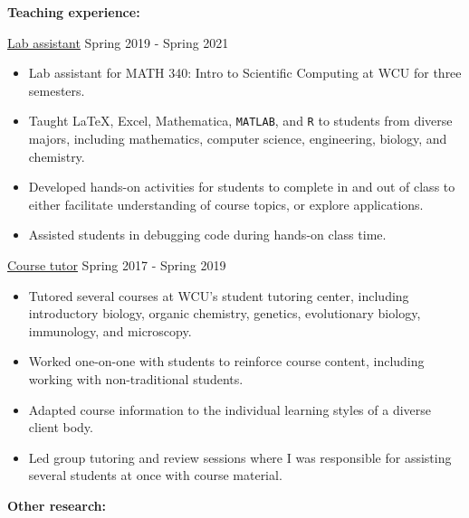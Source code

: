 \documentclass[11pt]{article}
\begin{document}
\vspace{0.2in}
\textbf{Teaching experience:}

\ul{Lab assistant} \hfill Spring 2019 - Spring 2021 
\begin{itemize}
\item Lab assistant for MATH 340: Intro to Scientific Computing at WCU for three semesters.
\item Taught \LaTeX{}, Excel, Mathematica, \texttt{MATLAB}, and \texttt{R} to students from diverse majors, including mathematics, computer science, engineering, biology, and chemistry.
\item Developed hands-on activities for students to complete in and out of class to either facilitate understanding of course topics, or explore applications.
\item Assisted students in debugging code during hands-on class time.
\end{itemize}

\ul{Course tutor} \hfill Spring 2017 - Spring 2019
\begin{itemize}
\item Tutored several courses at WCU's student tutoring center, including introductory biology, organic chemistry, genetics, evolutionary biology, immunology, and microscopy.
\item Worked one-on-one with students to reinforce course content, including working with non-traditional students.
\item Adapted course information to the individual learning styles of a diverse client body.
\item Led group tutoring and review sessions where I was responsible for assisting several students at once with course material.
\end{itemize}

\vspace{0.2in}


\vspace{0.2in}
\textbf{Other research:}
\end{document}
